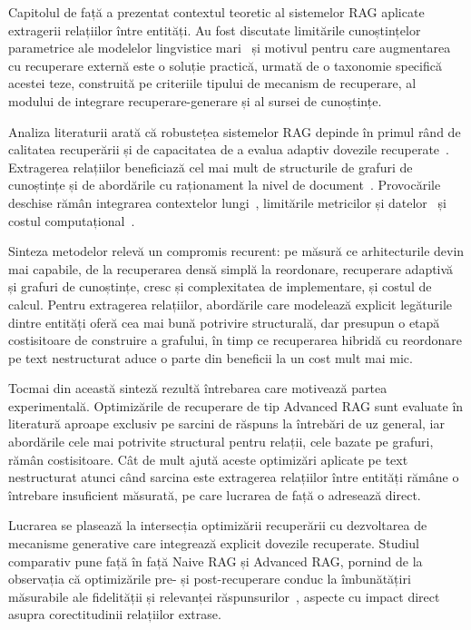 Capitolul de față a prezentat contextul teoretic al sistemelor RAG aplicate extragerii relațiilor între entități. Au fost discutate limitările cunoștințelor parametrice ale modelelor lingvistice mari~\cite{gao2024retrievalaugmentedgenerationlargelanguage, lewis2020rag} și motivul pentru care augmentarea cu recuperare externă este o soluție practică, urmată de o taxonomie specifică acestei teze, construită pe criteriile tipului de mecanism de recuperare, al modului de integrare recuperare-generare și al sursei de cunoștințe.

Analiza literaturii arată că robustețea sistemelor RAG depinde în primul rând de calitatea recuperării și de capacitatea de a evalua adaptiv dovezile recuperate~\cite{asai2023self, yan2024crag}. Extragerea relațiilor beneficiază cel mai mult de structurile de grafuri de cunoștințe și de abordările cu raționament la nivel de document~\cite{edge2024graphrag, gutierrez2024hipporag, yao2019docred}. Provocările deschise rămân integrarea contextelor lungi~\cite{jin2024long}, limitările metricilor și datelor~\cite{tan2022redocred, es2024ragas} și costul computațional~\cite{borgeaud2022retro}.

Sinteza metodelor relevă un compromis recurent: pe măsură ce arhitecturile devin mai capabile, de la recuperarea densă simplă la reordonare, recuperare adaptivă și grafuri de cunoștințe, cresc și complexitatea de implementare, și costul de calcul. Pentru extragerea relațiilor, abordările care modelează explicit legăturile dintre entități oferă cea mai bună potrivire structurală, dar presupun o etapă costisitoare de construire a grafului, în timp ce recuperarea hibridă cu reordonare pe text nestructurat aduce o parte din beneficii la un cost mult mai mic.

Tocmai din această sinteză rezultă întrebarea care motivează partea experimentală. Optimizările de recuperare de tip Advanced RAG sunt evaluate în literatură aproape exclusiv pe sarcini de răspuns la întrebări de uz general, iar abordările cele mai potrivite structural pentru relații, cele bazate pe grafuri, rămân costisitoare. Cât de mult ajută aceste optimizări aplicate pe text nestructurat atunci când sarcina este extragerea relațiilor între entități rămâne o întrebare insuficient măsurată, pe care lucrarea de față o adresează direct.

Lucrarea se plasează la intersecția optimizării recuperării cu dezvoltarea de mecanisme generative care integrează explicit dovezile recuperate. Studiul comparativ pune față în față Naive RAG și Advanced RAG, pornind de la observația că optimizările pre- și post-recuperare conduc la îmbunătățiri măsurabile ale fidelității și relevanței răspunsurilor~\cite{gao2024retrievalaugmentedgenerationlargelanguage, es2024ragas}, aspecte cu impact direct asupra corectitudinii relațiilor extrase.

